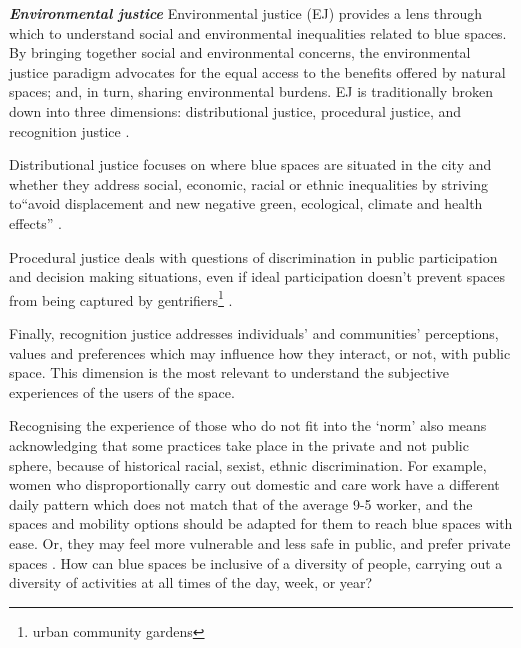 \documentclass{article}
\newcommand{\bisection}[1]{\textbf{\textit{#1}}}
\begin{document}
\bisection{Environmental justice}
Environmental justice (EJ) provides a lens through which to understand social and environmental inequalities related to blue spaces. By bringing together social and environmental concerns, the environmental justice paradigm advocates for the equal access to the benefits offered by natural spaces; and, in turn, sharing environmental burdens. 
EJ is traditionally broken down into three dimensions: distributional justice, procedural justice, and recognition justice \parencite{todo:cite schlosberg}.

Distributional justice focuses on where blue spaces are situated in the city and whether they address social, economic, racial or ethnic inequalities by striving to``avoid displacement and new negative green, ecological, climate and health effects'' \parencite{anguelovski2020expanding}.

Procedural justice deals with questions of discrimination in public participation and decision making situations, even if ideal participation doesn't prevent spaces from being captured by gentrifiers\footnote{urban community gardens} \parencite{anguelovski2020expanding}. 

Finally, recognition justice addresses individuals' and communities’ perceptions, values and preferences which may influence how they interact, or not, with public space. This dimension is the most relevant to understand the subjective experiences of the users of the space.

Recognising the experience of those who do not fit into the `norm' also means acknowledging that some practices take place in the private and not public sphere, because of historical racial, sexist, ethnic discrimination. For example, women who disproportionally carry out domestic and care work have a different daily pattern which does not match that of the average 9-5 worker, and the spaces and mobility options should be adapted for them to reach blue spaces with ease. Or, they may feel more vulnerable and less safe in public, and prefer private spaces \parencite{wessells2014urban}. How can blue spaces be inclusive of a diversity of people, carrying out a diversity of activities at all times of the day, week, or year? 
\end{document}
